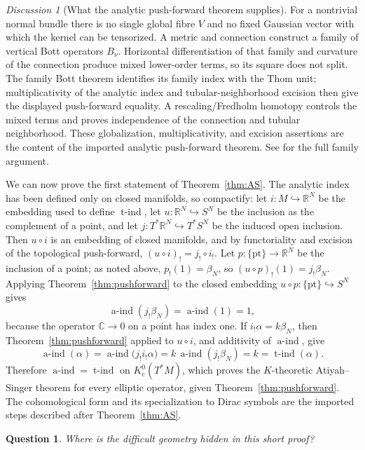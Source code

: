 \documentclass[11pt,oneside,reqno]{book}
\newcommand{\R}{\mathbb R}
\newcommand{\C}{\mathbb C}
\theoremstyle{plain}
\newtheorem{question}[theorem]{Question}
\theoremstyle{definition}
\theoremstyle{remark}
\newtheorem*{discussion}{Discussion}
\begin{document}
\begin{discussion}[What the analytic push-forward theorem supplies]
For a nontrivial normal bundle there is no single global fibre \(V\) and no
fixed Gaussian vector with which the kernel can be tensorized.  A metric
and connection construct a family of vertical Bott operators \(B_\nu\).
Horizontal differentiation of that family and curvature of the connection
produce mixed lower-order terms, so its square does not split.
The family Bott theorem identifies its family index with the Thom unit;
multiplicativity of the analytic index and tubular-neighborhood excision
then give the displayed push-forward equality.  A rescaling/Fredholm
homotopy controls the mixed terms and proves independence of the connection
and tubular neighborhood.  These globalization, multiplicativity, and
excision assertions are the content of the imported analytic push-forward
theorem.  See
\cite{ASI,ABS} for the full family argument.
\end{discussion}

We can now prove the first statement of Theorem~\ref{thm:AS}.  The
analytic index has been defined only on closed manifolds, so compactify:
let \(i:M\hookrightarrow\R^N\) be the embedding used to define
\(\operatorname{t\text{-}ind}\), let \(u:\R^N\hookrightarrow S^N\) be the
inclusion as the complement of a point, and let
\(j:T^*\R^N\hookrightarrow T^*S^N\) be the induced open inclusion.  Then
\(u\circ i\) is an embedding of closed manifolds, and by functoriality and
excision of the topological push-forward,
\((u\circ i)_!=j_!\circ i_!\).  Let \(p:\{\mathrm{pt}\}\to\R^N\) be the
inclusion of a point; as noted above, \(p_!(1)=\beta_N\), so
\((u\circ p)_!(1)=j_!\beta_N\).  Applying
Theorem~\ref{thm:pushforward} to the closed embedding
\(u\circ p:\{\mathrm{pt}\}\hookrightarrow S^N\) gives
\[
 \operatorname{a\text{-}ind}(j_!\beta_N)
 =\operatorname{a\text{-}ind}(1)=1,
\]
because the operator \(\C\to0\) on a point has index one.  If
\(i_!\alpha=k\beta_N\), then Theorem~\ref{thm:pushforward} applied to
\(u\circ i\), and additivity of \(\operatorname{a\text{-}ind}\), give
\[
 \operatorname{a\text{-}ind}(\alpha)
 =\operatorname{a\text{-}ind}\bigl(j_!i_!\alpha\bigr)
 =k\,\operatorname{a\text{-}ind}(j_!\beta_N)
 =k
 =\operatorname{t\text{-}ind}(\alpha).
\]
Therefore \(\operatorname{a\text{-}ind}=\operatorname{t\text{-}ind}\) on
\(K_c^0(T^*M)\), which proves the \(K\)-theoretic Atiyah--Singer theorem
for every elliptic operator, given Theorem~\ref{thm:pushforward}.  The
cohomological form and its specialization to Dirac symbols are the
imported steps described after Theorem~\ref{thm:AS}.

\begin{question}
Where is the difficult geometry hidden in this short proof?
\end{question}
\end{document}
